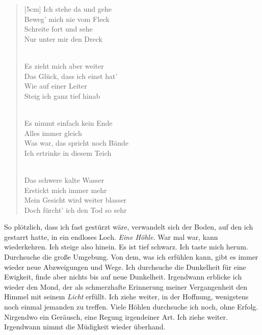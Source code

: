 \documentclass{article}
\begin{document}
	\begin{verse}[5cm]
		Ich stehe da und gehe \\
		Beweg’ mich nie vom Fleck \\
		Schreite fort und sehe \\
		Nur unter mir den Dreck \\
		
		\rule{0pt}{0pt}\\
		
		Es zieht mich aber weiter \\
		Das Glück, dass ich einst hat’ \\
		Wie auf einer Leiter \\
		Steig ich ganz tief hinab \\
		
		\rule{0pt}{0pt}\\
		
		Es nimmt einfach kein Ende \\
		Alles immer gleich			\\
		Was war, das spricht noch Bände \\
		Ich ertrinke in diesem Teich	\\
		
		\rule{0pt}{0pt}\\
		
		Das schwere kalte Wasser	\\
		Erstickt mich immer mehr	\\
		Mein Gesicht wird weiter blasser	\\
		Doch fürcht’ ich den Tod so sehr	\\
	\end{verse}
	
	So plötzlich, dass ich fast gestürzt wäre, verwandelt sich der Boden, auf den ich gestarrt hatte, in ein endloses Loch. \textit{Eine Höhle.} War mal war, kann wiederkehren. Ich steige also hinein. Es ist tief schwarz. Ich taste mich herum. Durchsuche die große Umgebung. Von dem, was ich erfühlen kann, gibt es immer wieder neue Abzweigungen und Wege. Ich durchsuche die Dunkelheit für eine Ewigkeit, finde aber nichts bis auf neue Dunkelheit. Irgendwann erblicke ich wieder den Mond, der als schmerzhafte Erinnerung meiner Vergangenheit den Himmel mit seinem \textit{Licht} erfüllt. Ich ziehe weiter, in der Hoffnung, wenigstens noch einmal jemanden zu treffen.  
	Viele Höhlen durchsuche ich noch, ohne Erfolg. Nirgendwo ein Geräusch, eine Regung irgendeiner Art. Ich ziehe weiter. Irgendwann nimmt die Müdigkeit wieder überhand.
	
\end{document}
